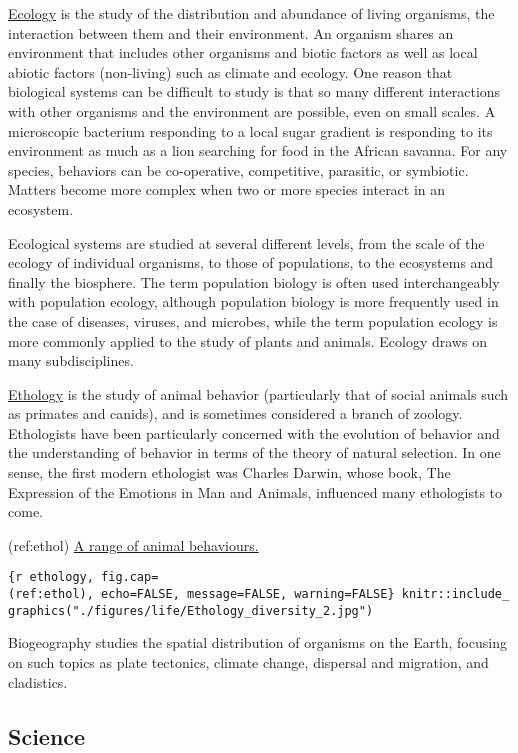 \documentclass[
]{article}
\begin{document}
\href{https://en.wikipedia.org/wiki/Ecology}{Ecology} is the study of
the distribution and abundance of living organisms, the interaction
between them and their environment. An organism shares an environment
that includes other organisms and biotic factors as well as local
abiotic factors (non-living) such as climate and ecology. One reason
that biological systems can be difficult to study is that so many
different interactions with other organisms and the environment are
possible, even on small scales. A microscopic bacterium responding to a
local sugar gradient is responding to its environment as much as a lion
searching for food in the African savanna. For any species, behaviors
can be co-operative, competitive, parasitic, or symbiotic. Matters
become more complex when two or more species interact in an ecosystem.

Ecological systems are studied at several different levels, from the
scale of the ecology of individual organisms, to those of populations,
to the ecosystems and finally the biosphere. The term population biology
is often used interchangeably with population ecology, although
population biology is more frequently used in the case of diseases,
viruses, and microbes, while the term population ecology is more
commonly applied to the study of plants and animals. Ecology draws on
many subdisciplines.

\href{https://en.wikipedia.org/wiki/Ethology}{Ethology} is the study of
animal behavior (particularly that of social animals such as primates
and canids), and is sometimes considered a branch of zoology.
Ethologists have been particularly concerned with the evolution of
behavior and the understanding of behavior in terms of the theory of
natural selection. In one sense, the first modern ethologist was Charles
Darwin, whose book, The Expression of the Emotions in Man and Animals,
influenced many ethologists to come.

(ref:ethol)
\href{https://commons.wikimedia.org/wiki/File:Ethology_diversity_2.jpg}{A
range of animal behaviours.}

\texttt{\{r\ ethology,\ fig.cap=\textquotesingle{}(ref:ethol)\textquotesingle{},\ echo=FALSE,\ message=FALSE,\ warning=FALSE\}\ knitr::include\_graphics("./figures/life/Ethology\_diversity\_2.jpg")}

Biogeography studies the spatial distribution of organisms on the Earth,
focusing on such topics as plate tectonics, climate change, dispersal
and migration, and cladistics.

\hypertarget{science}{%
\subsection{Science}\label{science}}
\end{document}
